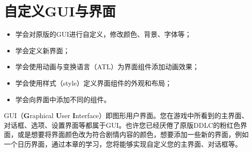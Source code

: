 \documentclass[../../Main.tex]{subfiles}
\begin{document}
\chapter{自定义GUI与界面}
\begin{ChapterGoals}
    \begin{itemize}
        \item 学会对原版的GUI进行自定义，修改颜色、背景、字体等；
        \item 学会定义新界面；
        \item 学会使用动画与变换语言（ATL）为界面组件添加动画效果；
        \item 学会使用样式（style）定义界面组件的外观和布局；
        \item 学会向界面中添加不同的组件。
    \end{itemize}
\end{ChapterGoals}

GUI（\textbf{G}raphical \textbf{U}ser \textbf{I}nterface）即图形用户界面。您在游戏中所看到的主界面、对话框、选项、设置界面等都属于GUI。也许您已经厌倦了原版DDLC的粉红色界面，或是想要将界面颜色改为符合剧情内容的颜色，想要添加一些新的界面，例如一个日历界面，通过本章的学习，您将能够实现自定义您的主界面、对话框等。



\end{document}
